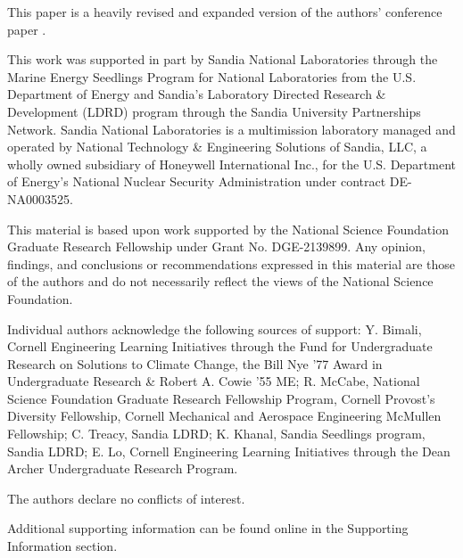\documentclass[ASNA,twocolumn]{USG} %
\begin{document}
  This paper is a heavily revised and expanded version of the authors' conference paper \citet{mccabe_open-source_2024}.


    This work was supported in part by Sandia National Laboratories through the Marine Energy Seedlings Program for National Laboratories from the U.S. Department of Energy and Sandia's Laboratory Directed Research \& Development (LDRD) program through the Sandia University Partnerships Network. 
    Sandia National Laboratories is a multimission laboratory managed and operated by National Technology \& Engineering Solutions of Sandia, LLC, a wholly owned subsidiary of Honeywell International Inc., for the U.S. Department of Energy's National Nuclear Security Administration under contract DE-NA0003525.

    This material is based upon work supported by the National Science Foundation Graduate Research Fellowship under Grant No. DGE-2139899.
Any opinion, findings, and conclusions or recommendations expressed in this material are those of the authors and do not necessarily reflect the views of the National Science Foundation.

    Individual authors acknowledge the following sources of support:
    Y. Bimali, Cornell Engineering Learning Initiatives through the Fund for Undergraduate Research on Solutions to Climate Change, the Bill Nye '77 Award in Undergraduate Research \& Robert A. Cowie '55 ME;
    R. McCabe, National Science Foundation Graduate Research Fellowship Program, Cornell Provost's Diversity Fellowship, Cornell Mechanical and Aerospace Engineering McMullen Fellowship; 
    C. Treacy, Sandia LDRD; 
    K. Khanal, Sandia Seedlings program, Sandia LDRD; 
    E. Lo, Cornell Engineering Learning Initiatives through the Dean Archer Undergraduate Research Program.


    The authors declare no conflicts of interest.




Additional supporting information can be found online in the Supporting Information
section.




\appendix
\end{document}
